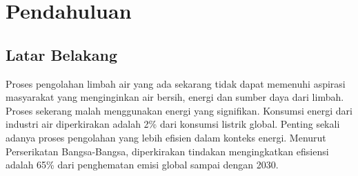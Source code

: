 \documentclass[10pt,a4paper,hidelinks]{article}
\begin{document}
    \pagestyle{plain}
    \title{\rmfamily\normalfont{}}
    \author{}
    \date{} %
    
    \maketitle
    
    \begin{abstract}
    	\noindent Proses pengolahan limbah air sekarang meninggalkan banyak ruang untuk dikembangkan dan ditingkatkan. Limbah dapat menjadi sumber energi yang berharga --- sekitar 9 kali lebih banyak energi terkandung dalam limbah dibandingkan dengan energi yang diperlukan untuk mengolahnya dengan cara modern. Proses-proses yang tersedia sekerang jarang mempertimbangkan dan menggunakan hal ini, proses-proses ini juga sering tidak efisien dan 'kotor'.
Menggabungkan teknologi-teknologi pengolahan limbah menjadi sebuah proses hibrida berpusat pada Microbial Fuel Cell (MFC) dapat memecahkan masalah ini.
    \end{abstract}
       
    \tableofcontents
    \section{Pendahuluan}
    \subsection{Latar Belakang}
    Proses pengolahan limbah air yang ada sekarang tidak dapat memenuhi aspirasi masyarakat yang menginginkan air bersih, energi dan sumber daya dari limbah. Proses sekerang malah menggunakan energi yang signifikan. Konsumsi energi dari industri air diperkirakan adalah 2\% dari konsumsi listrik global. Penting sekali adanya proses pengolahan yang lebih efisien dalam konteks energi. Menurut Perserikatan Bangsa-Bangsa, diperkirakan tindakan mengingkatkan efisiensi adalah 65\% dari penghematan emisi global sampai dengan 2030.
    
\end{document}
